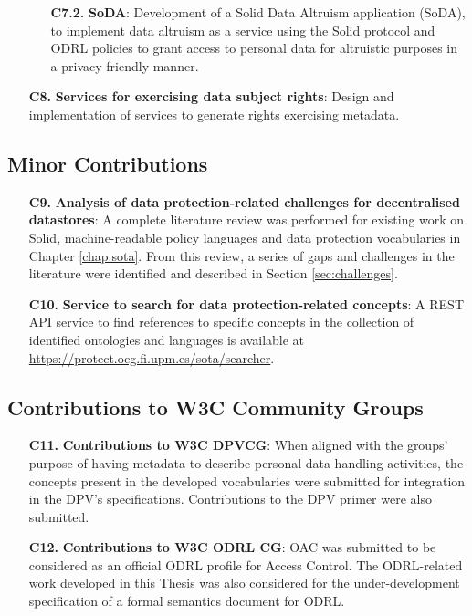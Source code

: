 \begin{enumerate}
\begin{enumerate}
    \item [\textbf{C7.2.}] \textbf{SoDA}: Development of a Solid Data Altruism application (SoDA), to implement data altruism as a service using the Solid protocol and ODRL policies to grant access to personal data for altruistic purposes in a privacy-friendly manner.
    \end{enumerate}
    \item [\textbf{C8.}] \textbf{Services for exercising data subject rights}: Design and implementation of services to generate rights exercising metadata.
\end{enumerate}

\subsection{Minor Contributions}
\label{sec:contr_minor}

\begin{enumerate}
    \item [\textbf{C9.}] \textbf{Analysis of data protection-related challenges for decentralised datastores}: A complete literature review was performed for existing work on Solid, machine-readable policy languages and data protection vocabularies in Chapter \ref{chap:sota}. From this review, a series of gaps and challenges in the literature were identified and described in Section \ref{sec:challenges}.
    \item [\textbf{C10.}] \textbf{Service to search for data protection-related concepts}: A REST API service to find references to specific concepts in the collection of identified ontologies and languages is available at \url{https://protect.oeg.fi.upm.es/sota/searcher}.
\end{enumerate}

\subsection{Contributions to W3C Community Groups}
\label{sec:contr_w3c}

\begin{enumerate}
    \item [\textbf{C11.}] \textbf{Contributions to W3C DPVCG}: When aligned with the groups' purpose of having metadata to describe personal data handling activities, the concepts present in the developed vocabularies were submitted for integration in the DPV's specifications. Contributions to the DPV primer were also submitted.
    \item [\textbf{C12.}] \textbf{Contributions to W3C ODRL CG}: OAC was submitted to be considered as an official ODRL profile for Access Control. The ODRL-related work developed in this Thesis was also considered for the under-development specification of a formal semantics document for ODRL.
\end{enumerate}